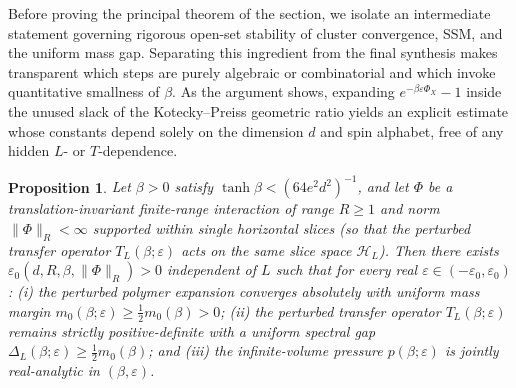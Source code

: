 \documentclass[11pt]{article}
\newtheorem{proposition}[theorem]{Proposition}
\theoremstyle{definition}
\begin{document}
Before proving the principal theorem of the section, we isolate an intermediate
statement governing rigorous open-set stability of cluster convergence, SSM, and the
uniform mass gap. Separating this ingredient from the final synthesis makes
transparent which steps are purely algebraic or combinatorial and which invoke
quantitative smallness of $\beta$. As the argument shows, expanding $e^{-\beta
\varepsilon \Phi_X} - 1$ inside the unused slack of the Kotecky--Preiss geometric
ratio yields an explicit estimate whose constants depend solely on the dimension $d$
and spin alphabet, free of any hidden $L$- or $T$-dependence.

\begin{proposition}
\label{prop:s10-stability}
Let $\beta > 0$ satisfy $\tanh \beta < (64 e^2 d^2)^{-1}$, and let $\Phi$ be a
translation-invariant finite-range interaction of range $R \ge 1$ and norm
$\|\Phi\|_R < \infty$ supported within single horizontal slices (so that the
perturbed transfer operator $T_L(\beta; \varepsilon)$ acts on the same slice space
$\mathcal{H}_L$). Then there exists $\varepsilon_0(d, R, \beta, \|\Phi\|_R) > 0$
independent of $L$ such that for every real $\varepsilon \in (-\varepsilon_0,
\varepsilon_0)$: (i) the perturbed polymer expansion converges absolutely with
uniform mass margin $m_0(\beta; \varepsilon) \ge \frac{1}{2} m_0(\beta) > 0$; (ii)
the perturbed transfer operator $T_L(\beta; \varepsilon)$ remains strictly
positive-definite with a uniform spectral gap $\Delta_L(\beta; \varepsilon) \ge
\frac{1}{2} m_0(\beta)$; and (iii) the infinite-volume pressure $p(\beta;
\varepsilon)$ is jointly real-analytic in $(\beta, \varepsilon)$.
\end{proposition}
\end{document}

